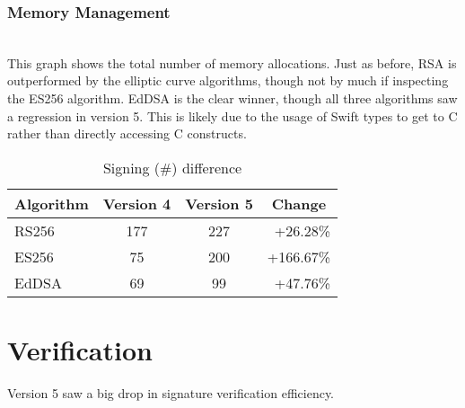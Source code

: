 \subsubsection*{Memory Management}

 \\
This graph shows the total number of memory allocations.
Just as before, RSA is outperformed by the elliptic curve algorithms, though not by much if inspecting the ES256 algorithm. EdDSA is the clear winner, though all three algorithms saw a regression in version 5. This is likely due to the usage of Swift types to get to C rather than directly accessing C constructs.
\begin{table}[h]
    \centering
    \begin{tabular}{lccr}
        \toprule
        Algorithm & Version 4 & Version 5 & \multicolumn{1}{c}{Change} \\
        \midrule
        RS256 & 177 & 227 & \textcolor{darkerred}{+26.28\%} \\
        ES256 & 75 & 200 & \textcolor{darkerred}{+166.67\%} \\
        EdDSA & 69 & 99 & \textcolor{darkerred}{+47.76\%} \\
        \bottomrule
    \end{tabular}
    \caption{Signing  (\#) difference }
\end{table}

\section{Verification}
Version 5 saw a big drop in signature verification efficiency.

